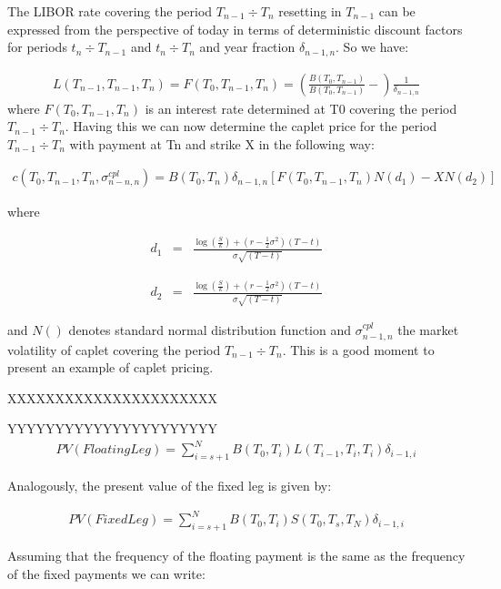 \documentclass[11pt]{article}
\numberwithin{equation}{subsection}
\begin{document}
The LIBOR rate covering the period \(T_{n−1}÷T_{n}\) resetting in \(T_{n−1}\) can be expressed from the
perspective of today in terms of deterministic discount factors for periods \(t_n÷T_{n-1}\) and \(t_n÷T_{n}\)
and year fraction \(\delta_{n−1,n}\). So we have:

\begin{eqnarray*}
	L(T_{n-1}, T_{n-1}, T_{n}) = F(T_{0}, T_{n-1}, T_{n}) = (\frac{B(T_0, T_{n-1})}{B(T_0, T_{n-1})} -)\frac{1}{\delta_{n−1,n}}
\end{eqnarray*}
where \(F(T_{0}, T_{n-1}, T_{n})\) is an interest rate determined at T0 covering the period  \(T_{n−1}÷T_{n}\).
Having this we can now determine the caplet price for the period \(T_{n−1}÷T_{n}\) with payment at Tn and strike X in the following way:

\begin{eqnarray*}
	c(T_{0}, T_{n-1}, T_{n}, \sigma_{n-n, n}^{cpl}) = B(T_0, T_{n}) \delta_{n−1,n} [F(T_{0}, T_{n-1}, T_{n})N(d_1)-XN(d_2)]
\end{eqnarray*}

where 

\begin{eqnarray*}
	d_1&=&\frac{\log(\frac{S}{k})+(r-\frac{1}{2}\sigma^2)(T-t)}{\sigma\sqrt{(T-t)}}
\end{eqnarray*}

\begin{eqnarray*}
	d_2&=&\frac{\log(\frac{S}{k})+(r-\frac{1}{2}\sigma^2)(T-t)}{\sigma\sqrt{(T-t)}}
\end{eqnarray*}

and \(N()\) denotes standard normal distribution function and \(\sigma_{n-1, n}^{cpl}\) the market volatility of caplet
covering the period \(T_{n−1}÷T_{n}\). This is a good moment to present an example of caplet pricing.

XXXXXXXXXXXXXXXXXXXXXX

YYYYYYYYYYYYYYYYYYYYYY
\begin{eqnarray*}
	PV(Floating Leg) = \sum_{i=s+1}^{N} B(T_0, T_{i}) L(T_{i-1}, T_{i}, T_{i}) \delta_{i−1,i} 
\end{eqnarray*}

Analogously, the present value of the fixed leg is given by:

\begin{eqnarray*}
	PV(Fixed Leg) = \sum_{i=s+1}^{N} B(T_0, T_{i}) S(T_{0}, T_{s}, T_{N}) \delta_{i−1,i} 
\end{eqnarray*}

Assuming that the frequency of the floating payment is the same as the frequency of the
fixed payments we can write:
\end{document}
